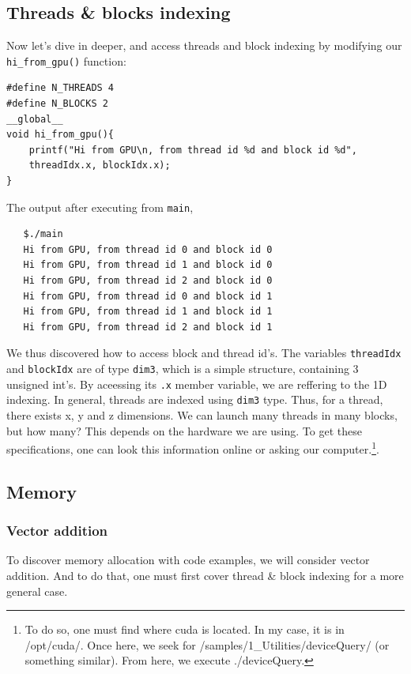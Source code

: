 \documentclass[12pt]{article}
\begin{document}
\subsection{Threads \& blocks indexing}
Now let's dive in deeper, and access threads and block indexing by modifying our 
\verb|hi_from_gpu()| function:
\vspace{-0.5cm}
\begin{verbatim}
#define N_THREADS 4
#define N_BLOCKS 2
__global__ 
void hi_from_gpu(){
    printf("Hi from GPU\n, from thread id %d and block id %d", 
    threadIdx.x, blockIdx.x);
}
\end{verbatim}
The output after executing from \verb|main|,
\vspace{-0.5cm}
\begin{verbatim}
   $./main
   Hi from GPU, from thread id 0 and block id 0 
   Hi from GPU, from thread id 1 and block id 0 
   Hi from GPU, from thread id 2 and block id 0 
   Hi from GPU, from thread id 0 and block id 1 
   Hi from GPU, from thread id 1 and block id 1 
   Hi from GPU, from thread id 2 and block id 1 
\end{verbatim}
\vspace{-0.5cm}
We thus discovered how to access block and thread id's. The 
variables \verb|threadIdx| and \verb|blockIdx| are of type \verb|dim3|,
which is a simple structure, containing 3 unsigned int's. By aceessing 
its \verb|.x| member variable, we are reffering to the 1D indexing. In general, 
threads are indexed using \verb|dim3| type. Thus, for a thread, there exists x, y and z 
dimensions.
We can launch many threads in many blocks, but how many? This depends on 
the hardware we are using.
To get these specifications, one can look this information online or asking our computer.\footnote{
To do so, one must find where {\selectfont cuda} is located. In my case, it is in 
{\selectfont /opt/cuda/}.
Once here, we seek for {\selectfont /samples/1\_Utilities/deviceQuery/} 
(or something similar). 
From here, we execute {\selectfont ./deviceQuery}.   
}.

\subsection{Memory}

\subsubsection{Vector addition}
To discover memory allocation with code examples, we will consider vector addition. And to do that, 
one must first cover thread \& block indexing for a more general case.
\end{document}
